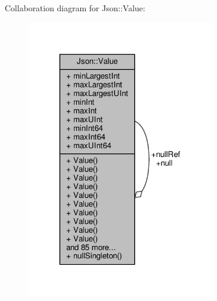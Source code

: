 Collaboration diagram for Json\+:\+:Value\+:
\nopagebreak
\begin{figure}[H]
\begin{center}
\leavevmode
\includegraphics[width=233pt]{d3/dff/classJson_1_1Value__coll__graph}
\end{center}
\end{figure}

